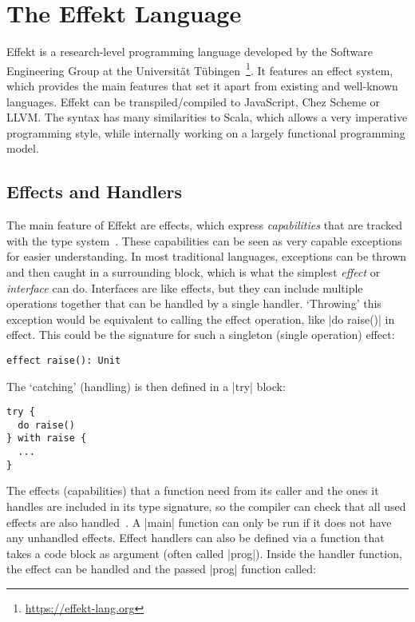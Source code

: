 \chapter{The Effekt Language}\label{chap:effekt}

Effekt is a research-level programming language developed by the Software Engineering Group at the Universität Tübingen~\footnote{\url{https://effekt-lang.org}}. It features an effect system, which provides the main features that set it apart from existing and well-known languages. Effekt can be transpiled/compiled to JavaScript, Chez Scheme or LLVM. The syntax has many similarities to Scala, which allows a very imperative programming style, while internally working on a largely functional programming model.

\section{Effects and Handlers}

The main feature of Effekt are effects, which express \textit{capabilities} that are tracked with the type system~\cite{brachthauser2020effects}. These capabilities can be seen as very capable exceptions for easier understanding. In most traditional languages, exceptions can be thrown and then caught in a surrounding block, which is what the simplest \textit{effect} or \textit{interface} can do. Interfaces are like effects, but they can include multiple operations together that can be handled by a single handler. `Throwing' this exception would be equivalent to calling the effect operation, like |do raise()| in effect. This could be the signature for such a singleton (single operation) effect:

\begin{lstlisting}
effect raise(): Unit
\end{lstlisting}

The `catching' (handling) is then defined in a |try| block:

\begin{lstlisting}
try {
  do raise()
} with raise {
  ...
}
\end{lstlisting}

The effects (capabilities) that a function need from its caller and the ones it handles are included in its type signature, so the compiler can check that all used effects are also handled~\cite{brachthauser2022effects}. A |main| function can only be run if it does not have any unhandled effects. Effect handlers can also be defined via a function that takes a code block as argument (often called |prog|). Inside the handler function, the effect can be handled and the passed |prog| function called:

